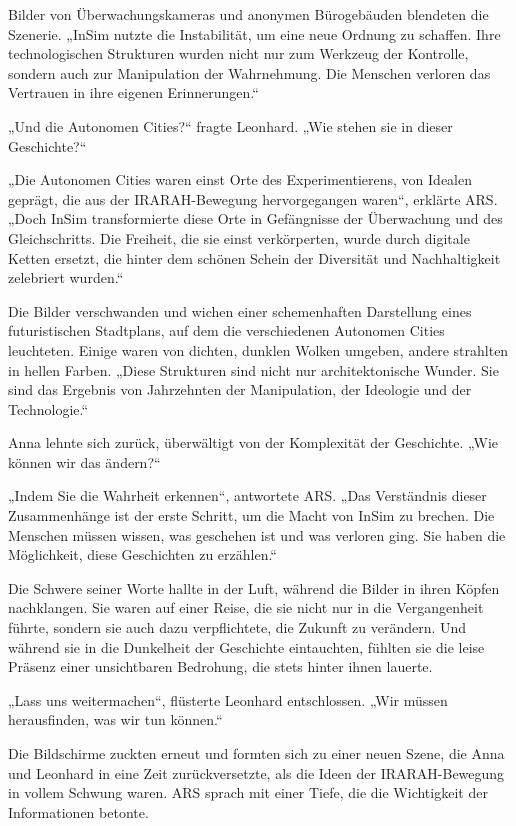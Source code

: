 \documentclass[
]{article}
\begin{document}
Bilder von Überwachungskameras und anonymen Bürogebäuden blendeten die Szenerie. „InSim nutzte die Instabilität, um eine neue Ordnung zu schaffen. Ihre technologischen Strukturen wurden nicht nur zum Werkzeug der Kontrolle, sondern auch zur Manipulation der Wahrnehmung. Die Menschen verloren das Vertrauen in ihre eigenen Erinnerungen.``

„Und die Autonomen Cities?{\kern0pt}`` fragte Leonhard. „Wie stehen sie in dieser Geschichte?{\kern0pt}``

„Die Autonomen Cities waren einst Orte des Experimentierens, von Idealen geprägt, die aus der IRARAH-Bewegung hervorgegangen waren``, erklärte ARS. „Doch InSim transformierte diese Orte in Gefängnisse der Überwachung und des Gleichschritts. Die Freiheit, die sie einst verkörperten, wurde durch digitale Ketten ersetzt, die hinter dem schönen Schein der Diversität und Nachhaltigkeit zelebriert wurden.``

Die Bilder verschwanden und wichen einer schemenhaften Darstellung eines futuristischen Stadtplans, auf dem die verschiedenen Autonomen Cities leuchteten. Einige waren von dichten, dunklen Wolken umgeben, andere strahlten in hellen Farben. „Diese Strukturen sind nicht nur architektonische Wunder. Sie sind das Ergebnis von Jahrzehnten der Manipulation, der Ideologie und der Technologie.``

Anna lehnte sich zurück, überwältigt von der Komplexität der Geschichte. „Wie können wir das ändern?{\kern0pt}``

„Indem Sie die Wahrheit erkennen``, antwortete ARS. „Das Verständnis dieser Zusammenhänge ist der erste Schritt, um die Macht von InSim zu brechen. Die Menschen müssen wissen, was geschehen ist und was verloren ging. Sie haben die Möglichkeit, diese Geschichten zu erzählen.``

Die Schwere seiner Worte hallte in der Luft, während die Bilder in ihren Köpfen nachklangen. Sie waren auf einer Reise, die sie nicht nur in die Vergangenheit führte, sondern sie auch dazu verpflichtete, die Zukunft zu verändern. Und während sie in die Dunkelheit der Geschichte eintauchten, fühlten sie die leise Präsenz einer unsichtbaren Bedrohung, die stets hinter ihnen lauerte.

„Lass uns weitermachen``, flüsterte Leonhard entschlossen. „Wir müssen herausfinden, was wir tun können.``

Die Bildschirme zuckten erneut und formten sich zu einer neuen Szene, die Anna und Leonhard in eine Zeit zurückversetzte, als die Ideen der IRARAH-Bewegung in vollem Schwung waren. ARS sprach mit einer Tiefe, die die Wichtigkeit der Informationen betonte.
\end{document}
